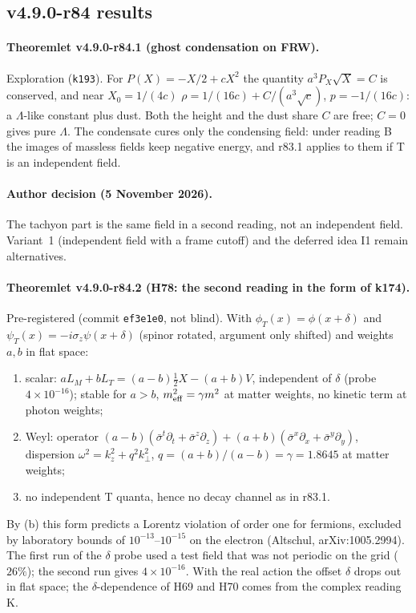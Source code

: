 \subsection*{v4.9.0-r84 results}
\label{subsec:v490-r84-results}

\paragraph{Theoremlet v4.9.0-r84.1 (ghost condensation on FRW).}
Exploration (\texttt{k193}).  For \(P(X)=-X/2+cX^2\) the quantity \(a^3P_X\sqrt X=C\) is conserved, and near \(X_0=1/(4c)\)
\(\rho=1/(16c)+C/(a^3\sqrt c)\), \(p=-1/(16c)\): a \(\Lambda\)-like constant plus dust.  Both the height and the dust share \(C\) are free;
\(C=0\) gives pure \(\Lambda\).  The condensate cures only the condensing field: under reading B the images of massless fields keep negative
energy, and r83.1 applies to them if T is an independent field.

\paragraph{Author decision (5 November 2026).}
The tachyon part is the same field in a second reading, not an independent field.  Variant~1 (independent field with a frame cutoff)
and the deferred idea I1 remain alternatives.

\paragraph{Theoremlet v4.9.0-r84.2 (H78: the second reading in the form of k174).}
Pre-registered (commit \texttt{ef3e1e0}, not blind).  With \(\phi_T(x)=\phi(x+\delta)\) and \(\psi_T(x)=-i\sigma_z\psi(x+\delta)\) (spinor
rotated, argument only shifted) and weights \(a,b\) in flat space:
\begin{enumerate}[leftmargin=2em]
\item[(a)] scalar: \(aL_M+bL_T=(a-b)\tfrac12X-(a+b)V\), independent of \(\delta\) (probe \(4\times10^{-16}\)); stable for \(a>b\),
\(m_{\rm eff}^2=\gamma m^2\) at matter weights, no kinetic term at photon weights;
\item[(b)] Weyl: operator \((a-b)(\bar\sigma^t\partial_t+\bar\sigma^z\partial_z)+(a+b)(\bar\sigma^x\partial_x+\bar\sigma^y\partial_y)\), dispersion
\(\omega^2=k_z^2+q^2k_\perp^2\), \(q=(a+b)/(a-b)=\gamma=1.8645\) at matter weights;
\item[(c)] no independent T quanta, hence no decay channel as in r83.1.
\end{enumerate}
By (b) this form predicts a Lorentz violation of order one for fermions, excluded by laboratory bounds of \(10^{-13}\)--\(10^{-15}\) on
the electron (Altschul, arXiv:1005.2994).  The first run of the \(\delta\) probe used a test field that was not periodic on the grid
(\(26\%\)); the second run gives \(4\times10^{-16}\).  With the real action the offset \(\delta\) drops out in flat space; the
\(\delta\)-dependence of H69 and H70 comes from the complex reading K.

